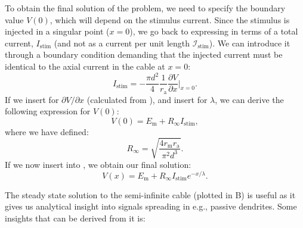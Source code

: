 To obtain the final solution of the problem, we need to specify the boundary value $V(0)$, which will depend on the stimulus current. Since the stimulus is injected in a singular point ($x=0$), we go back to expressing in terms of a total current, $I_\text{stim}$ (and not as a current per unit length $\mathcal{I}_\text{stim}$). We can introduce it through a boundary condition demanding that the injected current must be identical to the axial current in the cable at $x=0$:
\begin{equation}
I_\text{stim} = - \frac{\pi d^2}{4}\frac{1}{r_\text{a}} \frac{\partial V}{\partial x}   \Big|_{x=0}.
\end{equation}
If we insert for $\partial V/\partial x$ (calculated from ), and insert  for $\lambda$, we can derive the following expression for $V(0)$:
\begin{equation}
V(0) = E_\text{m} + R_{\infty}I_\text{stim}, 
\label{eq:Neuron:firstRinf}
\end{equation}
where we have defined:
\begin{equation}
R_{\infty} = \sqrt{\frac{4 r_\text{m} r_\text{a}}{\pi^2 d^3}}.
\label{eq:Neuron:Rinf}
\end{equation}
If we now insert  into , we obtain our final solution:
\begin{equation}
V(x) = E_\text{m} +R_{\infty}I_\text{stim}  e^{-x/\lambda}.
\label{eq:Neuron:semiinf5}
\end{equation}

The steady state solution to the semi-infinite cable (plotted in B) is useful as it gives us analytical insight into signals spreading in e.g., passive dendrites. Some insights that can be derived from it is:

